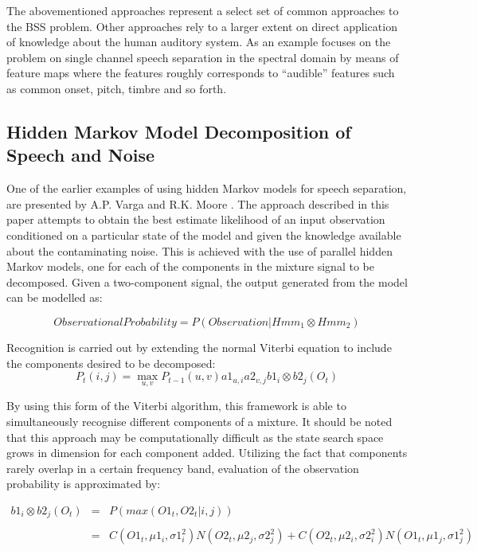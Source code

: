 The abovementioned approaches represent a select set of common
approaches to the  BSS problem. Other approaches rely to a larger
extent on direct application of knowledge about the human auditory
system. As an example \cite{bach} focuses on the problem on single channel speech
separation in the spectral domain by means of feature
maps where the features roughly corresponds to ``audible'' features such
as common onset, pitch, timbre and so forth. 

\newpage
\subsection{Hidden Markov Model Decomposition of Speech and Noise}
One of the earlier examples of using hidden Markov models for speech separation, are presented by A.P. Varga and R.K. Moore \cite{VargaHMMDecomp}. 
The approach described in this paper attempts to obtain the best estimate likelihood of an input observation conditioned on a particular state of the model and given the knowledge available about the contaminating noise. This is achieved with the use of parallel hidden Markov models, one for each of the components in the mixture signal to be decomposed. Given a two-component signal, the output generated from the model can be modelled as:

\begin{equation}\label{vargasEqn1}
Observational Probability = P(Observation|Hmm_1 \otimes Hmm_2)
\end{equation}

Recognition is carried out by extending the normal Viterbi equation to include the components desired to be decomposed:
\newline
\begin{equation}\label{vargasEqn2}
P_t(i,j) = \max_{u,v} P_{t-1} (u, v) a1_{u,i} a2_{v,j} b1_i \otimes b2_j (O_t)
\end{equation}

By using this form of the Viterbi algorithm, this framework is able to simultaneously recognise different components of a mixture. It should be noted that this approach may be computationally difficult as the state search space grows in dimension for each component added.
Utilizing the fact that components rarely overlap in a certain frequency band, evaluation of the observation probability is approximated by:

\begin{equation}\label{vargasEqn3}
\begin{array}{lcl}
b1_i \otimes b2_j(O_t) &=&  P(max(O1_t, O2_t|i,j)) \\
\\ &  = &  C(O1_t,\mu1_i,\sigma1^2_i)N(O2_t, \mu2_j,\sigma2^2_j) + C(O2_t,\mu2_i,\sigma2^2_i)N(O1_t, \mu1_j,\sigma1^2_j)\\
\end{array}
\end{equation}




